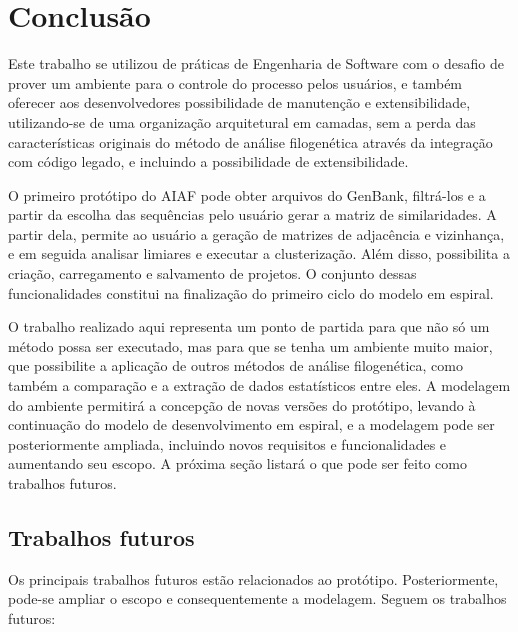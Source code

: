 \chapter{Conclusão} \label{cap:conclusao}

Este trabalho
se utilizou de práticas de Engenharia de Software com o desafio de prover um ambiente para o controle do processo pelos usuários,
e também oferecer aos desenvolvedores possibilidade de manutenção e extensibilidade, utilizando-se de uma organização arquitetural em camadas,
sem a perda das características originais do método de análise
filogenética através da integração com código legado, e incluindo a possibilidade de extensibilidade.

O primeiro protótipo do AIAF pode obter arquivos do GenBank, filtrá-los e a partir da escolha das sequências pelo usuário gerar a matriz de similaridades.
A partir dela, permite ao usuário a geração de matrizes de adjacência e vizinhança, e em seguida analisar limiares e executar a clusterização.
Além disso, possibilita a criação, carregamento e salvamento de projetos. O conjunto dessas funcionalidades
constitui na finalização do primeiro ciclo do modelo em espiral.

O trabalho realizado aqui representa um ponto de partida para que não só um método possa ser executado, mas para que se tenha um ambiente muito maior, que
possibilite a aplicação de outros métodos de análise filogenética, como também a comparação e a extração de dados estatísticos entre eles. A modelagem do
ambiente permitirá a concepção de novas versões do protótipo, levando à continuação do modelo de desenvolvimento em espiral, e a modelagem pode
ser posteriormente ampliada, incluindo novos requisitos e funcionalidades e aumentando seu escopo. A próxima seção listará o que pode ser feito como trabalhos
futuros.

\section{Trabalhos futuros}

Os principais trabalhos futuros estão relacionados ao protótipo. Posteriormente, pode-se ampliar o escopo e consequentemente a modelagem. Seguem os trabalhos
futuros:

